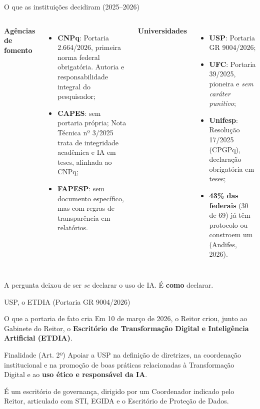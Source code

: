 \documentclass[11pt,aspectratio=169,t]{beamer}
\begin{document}
\begin{frame}{O que as instituições decidiram (2025--2026)}
  \footnotesize
  \begin{columns}[t]
    \textbf{\color{azulUNI}Agências de fomento}
    \begin{itemize}
      \item \textbf{CNPq}: Portaria 2.664/2026, \alert{primeira norma federal obrigatória}. Autoria e responsabilidade integral do pesquisador;
      \item \textbf{CAPES}: sem portaria própria; Nota Técnica nº 3/2025 trata de integridade acadêmica e IA em teses, alinhada ao CNPq;
      \item \textbf{FAPESP}: sem documento específico, mas com regras de transparência em relatórios.
    \end{itemize}
    \textbf{\color{azulUNI}Universidades}
    \begin{itemize}
      \item \textbf{USP}: Portaria GR 9004/2026;
      \item \textbf{UFC}: Portaria 39/2025, pioneira e \textit{sem caráter punitivo};
      \item \textbf{Unifesp}: Resolução 17/2025 (CPGPq), declaração obrigatória em teses;
      \item \textbf{43\% das federais} (30 de 69) já têm protocolo ou constroem um (Andifes, 2026).
    \end{itemize}
  \end{columns}
  \pause
  \vspace{0.15cm}
  \begin{block}{}
    \centering A pergunta deixou de ser \textit{se} declarar o uso de IA. É \textbf{como} declarar.
  \end{block}
\end{frame}
\begin{frame}{USP, o ETDIA (Portaria GR 9004/2026)}
  \begin{exampleblock}{O que a portaria de fato cria}
    Em 10 de março de 2026, o Reitor criou, junto ao Gabinete do Reitor, o \textbf{Escritório de Transformação Digital e Inteligência Artificial (ETDIA)}.
  \end{exampleblock}
  \pause
  \begin{block}{Finalidade (Art. 2º)}
    Apoiar a USP na definição de diretrizes, na coordenação institucional e na promoção de boas práticas relacionadas à Transformação Digital e ao \textbf{uso ético e responsável da IA}.
  \end{block}
  \pause
  \centering\small É um escritório de governança, dirigido por um Coordenador indicado pelo Reitor, articulado com STI, EGIDA e o Escritório de Proteção de Dados.
\end{frame}
\end{document}
